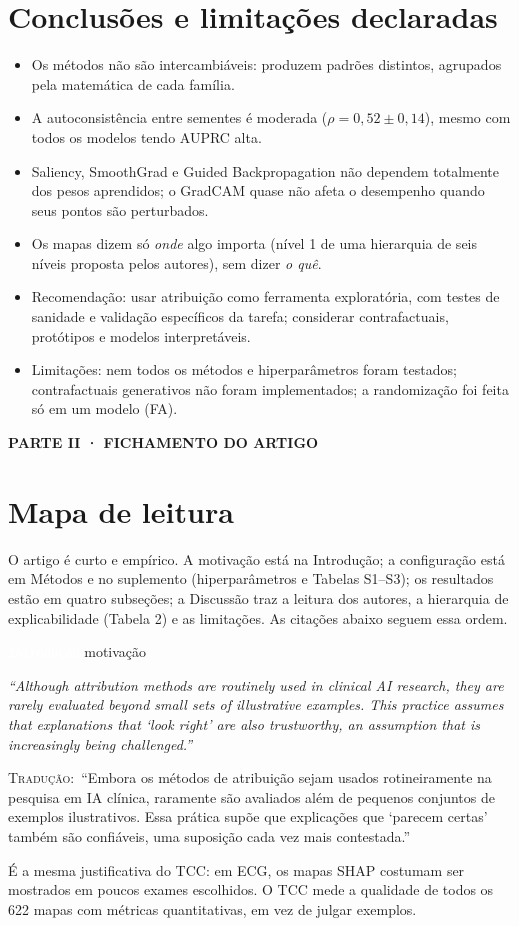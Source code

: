 \documentclass[11pt,a4paper]{article}
\newcommand{\pagechip}[1]{{\setlength{\fboxsep}{1.5pt}\colorbox{cAcc}{\textcolor{white}{\scriptsize\texttt{#1}}}}}
\newcommand{\partbar}[1]{\par\vspace{1.2em}\noindent\colorbox{black!80}{\parbox{\dimexpr\linewidth-2\fboxsep}{\color{white}\bfseries\sffamily\MakeUppercase{#1}}}\par\vspace{0.4em}}
\newenvironment{origquote}{\par\itshape\small}{\par}
\newenvironment{tradquote}{\par\small\textsc{Tradução:}\ }{\par}
\newcommand{\explab}[1]{\par\smallskip{\small\color{cAcc}\textbf{\MakeUppercase{#1}}}\par}
\begin{document}
\section{Conclusões e limitações declaradas}
\begin{itemize}
\item Os métodos não são intercambiáveis: produzem padrões distintos, agrupados pela matemática de cada família.
\item A autoconsistência entre sementes é moderada ($\rho = 0{,}52 \pm 0{,}14$), mesmo com todos os modelos tendo AUPRC alta.
\item Saliency, SmoothGrad e Guided Backpropagation não dependem totalmente dos pesos aprendidos; o GradCAM quase não afeta o desempenho quando seus pontos são perturbados.
\item Os mapas dizem só \textit{onde} algo importa (nível 1 de uma hierarquia de seis níveis proposta pelos autores), sem dizer \textit{o quê}.
\item Recomendação: usar atribuição como ferramenta exploratória, com testes de sanidade e validação específicos da tarefa; considerar contrafactuais, protótipos e modelos interpretáveis.
\item Limitações: nem todos os métodos e hiperparâmetros foram testados; contrafactuais generativos não foram implementados; a randomização foi feita só em um modelo (FA).
\end{itemize}

\partbar{Parte II · Fichamento do artigo}

\section{Mapa de leitura}
O artigo é curto e empírico. A motivação está na Introdução; a configuração está em Métodos e no suplemento (hiperparâmetros e Tabelas S1--S3); os resultados estão em quatro subseções; a Discussão traz a leitura dos autores, a hierarquia de explicabilidade (Tabela 2) e as limitações. As citações abaixo seguem essa ordem.

\begin{citacard}{\pagechip{Introdução} motivação}
\begin{origquote}“Although attribution methods are routinely used in clinical AI research, they are rarely evaluated beyond small sets of illustrative examples. This practice assumes that explanations that ‘look right’ are also trustworthy, an assumption that is increasingly being challenged.”\end{origquote}
\begin{tradquote}“Embora os métodos de atribuição sejam usados rotineiramente na pesquisa em IA clínica, raramente são avaliados além de pequenos conjuntos de exemplos ilustrativos. Essa prática supõe que explicações que ‘parecem certas’ também são confiáveis, uma suposição cada vez mais contestada.”\end{tradquote}
\explab{Explicação}
É a mesma justificativa do TCC: em ECG, os mapas SHAP costumam ser mostrados em poucos exames escolhidos. O TCC mede a qualidade de todos os 622 mapas com métricas quantitativas, em vez de julgar exemplos.
\end{citacard}
\end{document}
